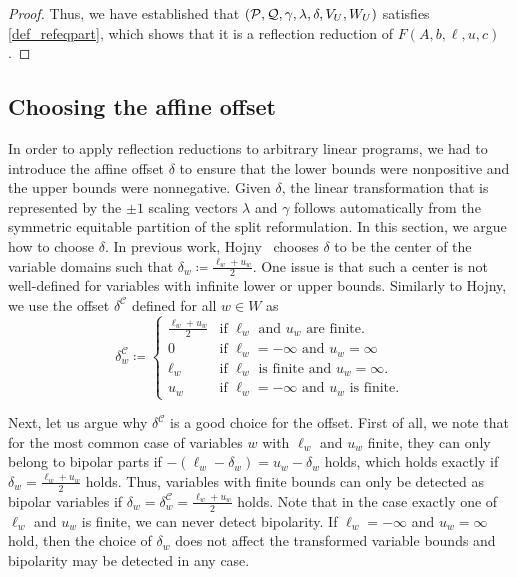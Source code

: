 \documentclass[pdflatex,sn-mathphys-num]{sn-jnl}%
\theoremstyle{thmstyleone}%
\theoremstyle{thmstylethree}%
\theoremstyle{thmstyletwo}%
\begin{document}
\begin{proof}
    Thus, we have established that $(\mathcal{P}, \mathcal{Q}, \gamma, \lambda, \delta, V_U, W_U)$ satisfies \cref{def_refeqpart}, which shows that it is a reflection reduction of $F(A,b,\ell,u,c)$.
\end{proof}
\subsection{Choosing the affine offset}
\label{sec_choosing_affine_offset}
In order to apply reflection reductions to arbitrary linear programs, we had to introduce the affine offset $\delta$ to ensure that the lower bounds were nonpositive and the upper bounds were nonnegative. Given $\delta$, the linear transformation that is represented by the $\pm1$ scaling vectors $\lambda$ and $\gamma$ follows automatically from the symmetric equitable partition of the split reformulation. In this section, we argue how to choose $\delta$. In previous work, Hojny~\cite{Hojny2025-si} chooses $\delta$ to be the center of the variable domains such that $\delta_w \coloneqq \frac{\ell_w + u_w}{2}$. One issue is that such a center is not well-defined for variables with infinite lower or upper bounds. Similarly to Hojny, we use the offset $\delta^\mathcal{C}$ defined for all $w\in W$ as
\begin{equation*}
    \delta^\mathcal{C}_w \coloneqq \begin{cases}
        \frac{\ell_w + u_w}2 &\text{if $\ell_w$ and $u_w$ are finite.}\\
        0 &\text{if $\ell_w = -\infty$ and $u_w = \infty$}\\
        \ell_w &\text{if $\ell_w$ is finite and $u_w = \infty$.}\\
        u_w &\text{if $\ell_w = -\infty$ and $u_w$ is finite.}
    \end{cases}
\end{equation*}

Next, let us argue why $\delta^\mathcal{C}$ is a good choice for the offset. First of all, we note that for the most common case of variables $w$ with $\ell_w$ and $u_w$ finite, they can only belong to bipolar parts if $-(\ell_w - \delta_w) = u_w - \delta_w$ holds, which holds exactly if $\delta_w = \frac{\ell_w + u_w}2$ holds. Thus, variables with finite bounds can only be detected as bipolar variables if $\delta_w = \delta^\mathcal{C}_w = \frac{\ell_w + u_w}2$ holds. Note that in the case exactly one of $\ell_w$ and $u_w$ is finite, we can never detect bipolarity. If $\ell_w = -\infty$ and $u_w = \infty$ hold, then the choice of $\delta_w$ does not affect the transformed variable bounds and bipolarity may be detected in any case.\\
\end{document}
